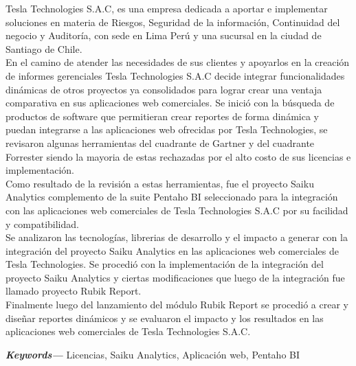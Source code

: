 \makeatletter
\newenvironment{abstract}{%
	\titlepage
	\null\vfil
	\@beginparpenalty\@lowpenalty
	\begin{center}%
		\large\bfseries\abstractname
		\@endparpenalty\@M
	\end{center}
}%
{\par\vfil\null
	\endtitlepage}
\makeatother

\providecommand{\keywords}[1]
{
	\small	
	\textbf{\textit{Keywords---}} #1
}
\begin{titlepage}
	 \begin{abstract}
		\begin{spacing}{1.5}
		Tesla Technologies S.A.C, es una empresa dedicada a aportar e implementar soluciones en materia de Riesgos, Seguridad de la información, Continuidad del negocio y Auditoría, con sede en Lima Perú y una sucursal en la ciudad de Santiago de Chile.\\	
		En el camino de atender las necesidades de sus clientes y apoyarlos en la creación de informes gerenciales Tesla Technologies S.A.C decide integrar funcionalidades dinámicas de otros proyectos ya consolidados para lograr crear una ventaja comparativa en sus aplicaciones web comerciales.
		Se inició con la búsqueda de productos de software que permitieran crear reportes de forma dinámica y puedan integrarse a las aplicaciones web ofrecidas por Tesla Technologies, se revisaron algunas herramientas del cuadrante de Gartner y del cuadrante Forrester siendo la mayoria de estas rechazadas por el alto costo de sus licencias e implementación.\\
		Como resultado de la revisión a estas herramientas, fue el proyecto Saiku Analytics complemento de la suite Pentaho BI seleccionado para la integración con las aplicaciones web comerciales de Tesla Technologies S.A.C por su facilidad y compatibilidad.\\
		Se analizaron las tecnologías, librerias de desarrollo y el impacto a generar  con la integración del proyecto Saiku Analytics en las aplicaciones web comerciales de Tesla Technologies.
		Se procedió con la implementación de la integración del proyecto Saiku Analytics y ciertas modificaciones que luego de la integración fue llamado proyecto Rubik Report.\\
		Finalmente luego del lanzamiento del módulo Rubik Report se procedió a crear y diseñar reportes dinámicos y se evaluaron el impacto y los resultados en las aplicaciones web comerciales de Tesla Technologies S.A.C.\\		
		\end{spacing}
	\keywords{Licencias, Saiku Analytics, Aplicación web, Pentaho BI}
	\end{abstract}
\end{titlepage}